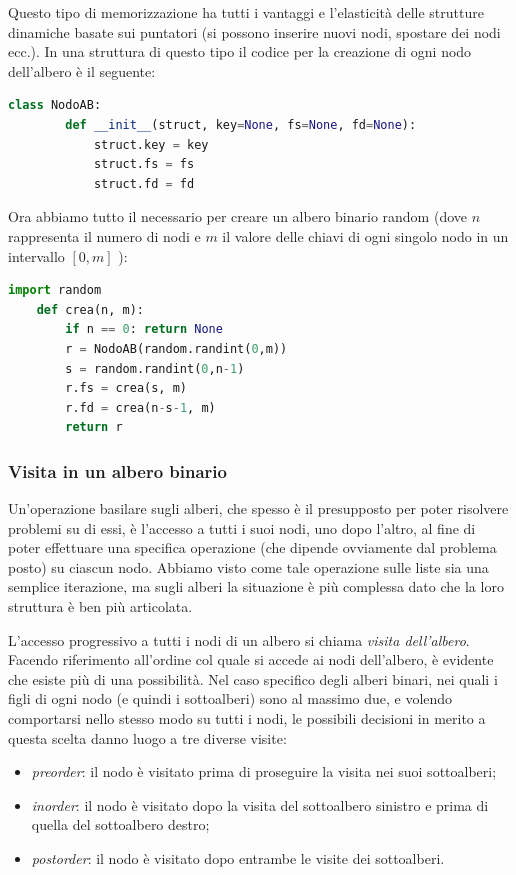 Questo tipo di memorizzazione ha tutti i vantaggi e l’elasticità delle strutture dinamiche basate sui puntatori (si possono inserire nuovi nodi, spostare dei nodi ecc.). In una struttura di questo tipo il codice per la creazione di ogni nodo dell'albero è il seguente:
\begin{lstlisting}[language=Python]
    class NodoAB:
        def __init__(struct, key=None, fs=None, fd=None):
            struct.key = key
            struct.fs = fs
            struct.fd = fd
\end{lstlisting}
Ora abbiamo tutto il necessario per creare un albero binario random (dove $n$ rappresenta il numero di nodi e $m$ il valore delle chiavi di ogni singolo nodo in un intervallo $[0,m]$ ):
\begin{lstlisting}[language=Python]
    import random
    def crea(n, m):
        if n == 0: return None
        r = NodoAB(random.randint(0,m))
        s = random.randint(0,n-1)
        r.fs = crea(s, m)
        r.fd = crea(n-s-1, m)
        return r
\end{lstlisting}

\subsubsection{Visita in un albero binario}
Un’operazione basilare sugli alberi, che spesso è il presupposto per poter risolvere problemi su di essi, è l’accesso a tutti i suoi nodi, uno dopo l’altro, al fine di poter effettuare una specifica operazione (che dipende ovviamente dal problema posto) su ciascun nodo. Abbiamo visto come tale operazione sulle liste sia una semplice iterazione, ma sugli alberi la situazione è più complessa dato che la loro struttura è ben più articolata.

L’accesso progressivo a tutti i nodi di un albero si chiama \textit{visita dell'albero}. Facendo riferimento all’ordine col quale si accede ai nodi dell'albero, è evidente che esiste più di una possibilità.
Nel caso specifico degli alberi binari, nei quali i figli di ogni nodo (e quindi i sottoalberi) sono al massimo due, e volendo comportarsi nello stesso modo su tutti i nodi, le possibili decisioni in merito a questa scelta danno luogo a tre diverse visite: 
\begin{itemize}
    \item \textit{preorder}: il nodo è visitato prima di proseguire la visita nei suoi sottoalberi;
    \item \textit{inorder}: il nodo è visitato dopo la visita del sottoalbero sinistro e prima di quella del sottoalbero destro;
    \item \textit{postorder}: il nodo è visitato dopo entrambe le visite dei sottoalberi.
\end{itemize}

